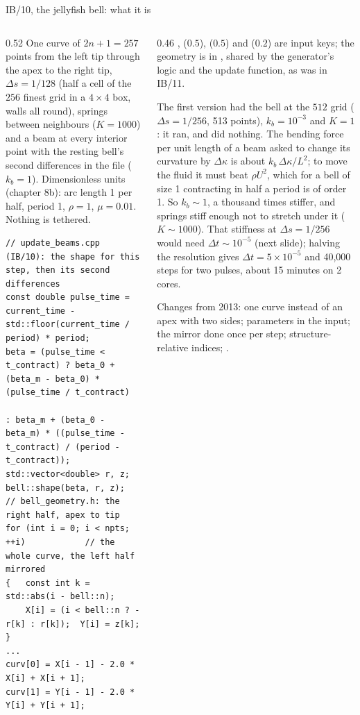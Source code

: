 \documentclass[aspectratio=169,11pt]{beamer}
\begin{document}
\begin{frame}[fragile]{IB/10, the jellyfish bell: what it is}
\label{fr:jelly3}
\vspace{-1mm}
\begin{columns}[T,onlytextwidth]
\begin{column}{0.52\textwidth}
\footnotesize One curve of $2n + 1 = 257$ points from the left tip through the apex to the right tip, $\Delta s = 1/128$ (half a cell of the $256$ finest grid in a $4\times4$ box, walls all round), springs between neighbours ($K = 1000$) and a beam at every interior point with the resting bell's second differences in the file ($k_b = 1$). Dimensionless units (chapter 8b): arc length 1 per half, period 1, $\rho = 1$, $\mu = 0.01$. Nothing is tethered.
\begin{lstlisting}[style=cpptiny]
// update_beams.cpp (IB/10): the shape for this step, then its second differences
const double pulse_time = current_time - std::floor(current_time / period) * period;
beta = (pulse_time < t_contract) ? beta_0 + (beta_m - beta_0) * (pulse_time / t_contract)
                                 : beta_m + (beta_0 - beta_m) * ((pulse_time - t_contract) / (period - t_contract));
std::vector<double> r, z;
bell::shape(beta, r, z);                  // bell_geometry.h: the right half, apex to tip
for (int i = 0; i < npts; ++i)            // the whole curve, the left half mirrored
{   const int k = std::abs(i - bell::n);
    X[i] = (i < bell::n ? -r[k] : r[k]);  Y[i] = z[k]; }
...
curv[0] = X[i - 1] - 2.0 * X[i] + X[i + 1];
curv[1] = Y[i - 1] - 2.0 * Y[i] + Y[i + 1];
\end{lstlisting}
\end{column}
\begin{column}{0.46\textwidth}
\scriptsize {},  ($0.5$),  ($0.5$) and  ($0.2$) are input keys; the geometry is in , shared by the generator's logic and the update function, as  was in IB/11.
\vspace{1mm}

\scriptsize {} The first version had the bell at the $512$ grid ($\Delta s = 1/256$, 513 points), $k_b = 10^{-3}$ and $K = 1$: it ran, and did nothing. The bending force per unit length of a beam asked to change its curvature by $\Delta\kappa$ is about $k_b\,\Delta\kappa/L^2$; to move the fluid it must beat $\rho U^2$, which for a bell of size 1 contracting in half a period is of order 1. So $k_b \sim 1$, a thousand times stiffer, and springs stiff enough not to stretch under it ($K \sim 1000$). That stiffness at $\Delta s = 1/256$ would need $\Delta t \sim 10^{-5}$ (next slide); halving the resolution gives $\Delta t = 5\times10^{-5}$ and 40,000 steps for two pulses, about 15 minutes on 2 cores.
\vspace{1mm}

\scriptsize Changes from 2013: one curve instead of an apex with two sides; parameters in the input; the mirror done once per step; structure-relative indices; .
\end{column}
\end{columns}
\end{frame}
\end{document}
